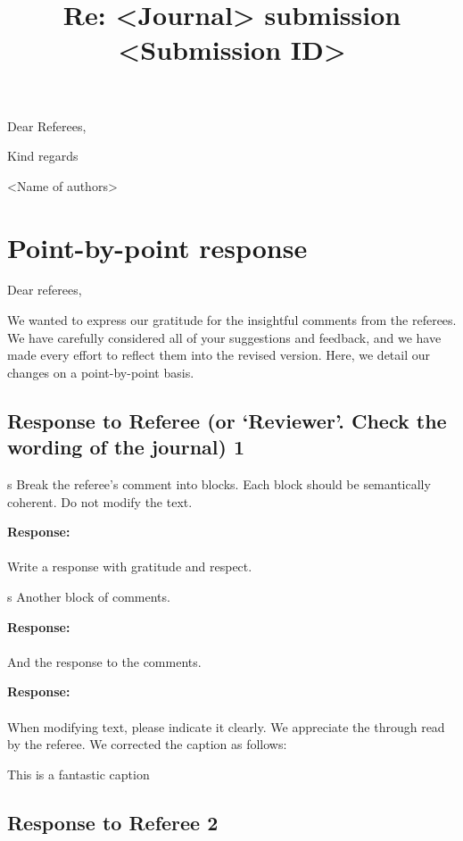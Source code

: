 \documentclass[12pt]{article}
\title{Re: <Journal> submission <Submission ID>}
\date{}
\makeatletter
\newcounter{comment}[subsection]
\newcommand{\response}[1]{{\noindent \textbf{Response:} \\ \\ \noindent #1}}
\newcommand{\rcomment}[1]{%
\vspace{10pt}
\begin{sectionbox}
s #1
\end{sectionbox}
}
\renewcommand{\maketitle}{\bgroup\setlength{\parindent}{0pt}
\begin{flushleft}
\Large  \textbf{\@title}
\end{flushleft}\egroup
}
\makeatother
\begin{document}
\maketitle

\bigskip
\thispagestyle{empty}
\vspace{-0.4cm}
\noindent Dear Referees,\\
\vspace{-0.25cm}

\bigskip

Kind regards

\bigskip

<Name of authors>

\clearpage
{}
\setcounter{page}{1}
\tableofcontents
\clearpage

\section{Point-by-point response}
Dear referees,

We wanted to express our gratitude for the insightful comments from the referees. We have carefully considered all of your suggestions and feedback, and we have made every effort to reflect them into the revised version. Here, we detail our changes on a point-by-point basis.

\subsection{Response to Referee (or `Reviewer'. Check the wording of the journal) 1}
\setcounter{section}{1}


\rcomment{%
Break the referee's comment into blocks. Each block should be semantically coherent. Do not modify the text. 
}

\response{
	Write a response with gratitude and respect. 
}

\rcomment{
	Another block of comments.
}

\response{
	And the response to the comments.
}

\response{
When modifying text, please indicate it clearly.  
We appreciate the through read by the referee. We corrected the caption as follows:

\begin{displayquote}
\color{blue}
This is a fantastic caption  
\end{displayquote}
}


\clearpage

\subsection{Response to Referee 2}
\clearpage
\printbibliography{}
\end{document}
